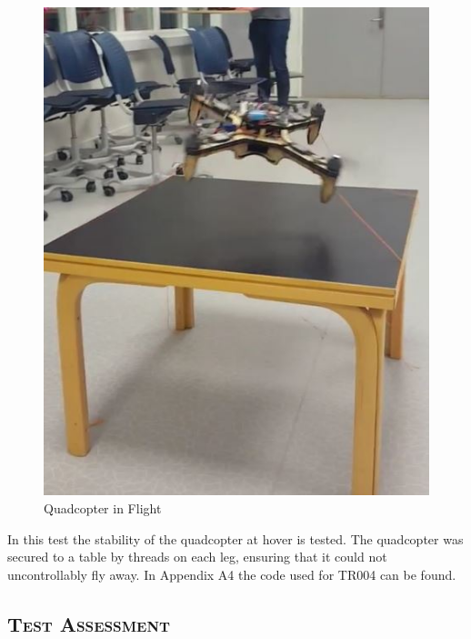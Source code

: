 \begin{figure}[h]
\begin{minipage}[b]{0.45\textwidth}
            \includegraphics[width = 1\textwidth]{VAPIQ-PICTURES/flighttest}
            \caption{Quadcopter in Flight}
            \label{fig:ft2}
        \end{minipage}
\end{figure}

In this test the stability of the quadcopter at hover is tested. The quadcopter was secured to a table by threads on each leg, ensuring that it could not uncontrollably fly away. In Appendix A4 the code used for TR004 can be found. 

\subsection*{\textsc{\medium Test Assessment}}

